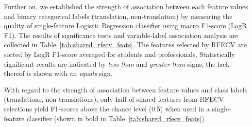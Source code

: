 Further on, we established the strength of association between each feature values and binary categorical labels (translation, non-translation) by measuring the quality of single-feature Logistic Regression classifier using macro F1-score (LogR F1). The results of significance tests and variable-label association analysis are collected in Table~\ref{tab:shared_rfecv_feats}. The features selected by RFECV are sorted by LogR F1-score averaged for students and professionals. Statistically significant results are indicated by \textit{less-than} and \textit{greater-than} signs, the lack thereof is shown with an \textit{equals} sign.

With regard to the strength of association between feature values and class labels (translations, non-translations), only half of shared features from RFECV selections yield F1-scores above the chance level (0.5) when used in a single-feature classifier (shown in bold in Table~\ref{tab:shared_rfecv_feats}).

